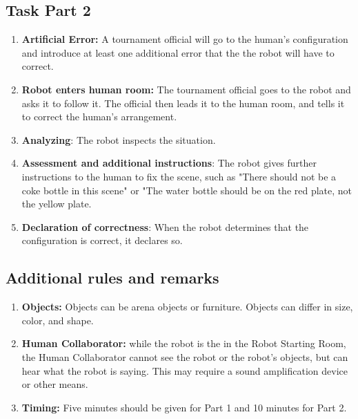\subsection{Task Part 2}
\begin{enumerate}

\item \textbf{Artificial Error:} A tournament official will go to the human's configuration and introduce at least one additional error that the the robot will have to correct.

\item \textbf{Robot enters human room:}  The tournament official goes to the robot and asks it to follow it.  The official then leads it to the human room, and tells it to correct the human's arrangement.

\item \textbf{Analyzing}: The robot inspects the situation.

\item \textbf{Assessment and additional instructions}: The robot gives further instructions to the human to fix the scene, such as "There should not be a coke bottle in this scene" or "The water bottle should be on the red plate, not the yellow plate.

\item \textbf{Declaration of correctness}: When the robot determines that the configuration is correct, it declares so.

\end{enumerate}

\subsection{Additional rules and remarks}
\begin{enumerate}
	\item \textbf{Objects:} Objects can be arena objects or furniture.  Objects can differ in size, color, and shape.

	\item \textbf{Human Collaborator:} while the robot is the in the Robot Starting Room, the Human Collaborator cannot see the robot or the robot's objects, but can hear what the robot is saying.  This may require a sound amplification device or other means.

	\item \textbf{Timing:} Five minutes should be given for Part 1 and 10 minutes for Part 2.

\end{enumerate}

